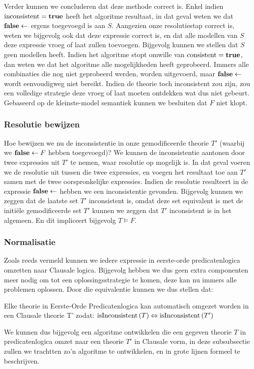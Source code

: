 Verder kunnen we concluderen dat deze methode correct is. Enkel indien $\mbox{inconsistent}=\mbox{\bf true}$ heeft het algoritme resultaat, in dat geval weten we dat $\mbox{\bf false}\leftarrow$ ergens toegevoegd is aan $S$. Aangezien onze resolutiestap correct is, weten we bijgevolg ook dat deze expressie correct is, en dat alle modellen van $S$ deze expressie vroeg of laat zullen toevoegen. Bijgevolg kunnen we stellen dat $S$ geen modellen heeft. Indien het algoritme stopt omwille van $\mbox{consistent}=\mbox{\bf true}$, dan weten we dat het algoritme alle mogelijkheden heeft geprobeerd. Immers alle combinaties die nog niet geprobeerd werden, worden uitgevoerd, maar $\mbox{\bf false}\leftarrow$ wordt eenvoudigweg niet bereikt. Indien de theorie toch inconsistent zou zijn, zou een volledige strategie deze vroeg of laat moeten ontdekken wat dus niet gebeurt. Gebaseerd op de kleinste-model semantiek kunnen we besluiten dat $F$ niet klopt.
\subsubsection{Resolutie bewijzen}
\label{sss:resolutionProof}
Hoe bewijzen we nu de inconsistentie in onze gemodificeerde theorie $T'$ (waarbij we $\mbox{\bf false}\leftarrow F$ hebben toegevoegd)? We kunnen de inconsistentie aantonen door twee expressies uit $T'$ te nemen, waar resolutie op mogelijk is. In dat geval voeren we de resolutie uit tussen die twee expressies, en voegen het resultaat toe aan $T'$ samen met de twee oorspronkelijke expressies. Indien de resolutie resulteert in de expressie $\mbox{\bf false}\leftarrow$ hebben we een inconsistentie gevonden. Bijgevolg kunnen we zeggen dat de laatste set $T'$ inconsistent is, omdat deze set equivalent is met de initi\"ele gemodificeerde set $T'$ kunnen we zeggen dat $T'$ inconsistent is in het algemeen. En dit impliceert bijgevolg $T\vDash F$.
\subsubsection{Normalisatie}
\label{sss:normalisation}
Zoals reeds vermeld kunnen we iedere expressie in eerste-orde predicatenlogica omzetten naar Clausale logica. Bijgevolg hebben we dus geen extra componenten meer nodig om tot een oplossingsstrategie te komen, deze kan nu immers alle problemen oplossen. Door die equivalentie kunnen we dus stellen dat:
\begin{theorem}
Elke theorie in Eerste-Orde Predicatenlogica kan automatisch omgezet worden in een Clausale theorie T' zodat: $\mbox{isInconsistent}\left( T \right)\Leftrightarrow\mbox{isInconsistent}\left( T' \right)$
\end{theorem}
We kunnen dus bijgevolg een algoritme ontwikkelen die een gegeven theorie $T$ in predicatenlogica omzet naar een theorie $T'$ in Clausale vorm, in deze subsubsectie zullen we trachtten zo'n algoritme te ontwikkelen, en in grote lijnen formeel te beschrijven.
